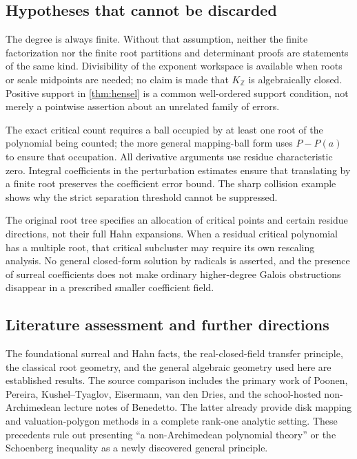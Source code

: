 \documentclass[11pt,letterpaper]{article}
\numberwithin{equation}{section}
\theoremstyle{definition}
\theoremstyle{remark}\newtheorem{remark}[theorem]{Remark}
\newcommand{\Z}{\mathbb Z}
\begin{document}
\subsection{Hypotheses that cannot be discarded}
The degree is always finite. Without that assumption, neither the
finite factorization nor the finite root partitions and determinant
proofs are statements of the same kind. Divisibility of the exponent
workspace is available when roots or scale midpoints are needed;
no claim is made that $K_\Z$ is algebraically closed. Positive support
in \cref{thm:hensel} is a common well-ordered support condition, not
merely a pointwise assertion about an unrelated family of errors.

The exact critical count requires a ball occupied by at least one
root of the polynomial being counted; the more general mapping-ball
form uses $P-P(a)$ to ensure that occupation. All derivative arguments
use residue characteristic zero. Integral coefficients in the
perturbation estimates ensure that translating by a finite root
preserves the coefficient error bound. The sharp collision example
shows why the strict separation threshold cannot be suppressed.

The original root tree specifies an allocation of critical points and
certain residue directions, not their full Hahn expansions. When a
residual critical polynomial has a multiple root, that critical
subcluster may require its own rescaling analysis. No general
closed-form solution by radicals is asserted, and the presence of
surreal coefficients does not make ordinary higher-degree Galois
obstructions disappear in a prescribed smaller coefficient field.

\subsection{Literature assessment and further directions}
The foundational surreal and Hahn facts, the real-closed-field transfer
principle, the classical root geometry, and the general algebraic
geometry used here are established results. The source comparison
includes the primary work of Poonen, Pereira, Kushel--Tyaglov,
Eisermann, van den Dries, and the school-hosted non-Archimedean lecture
notes of Benedetto. The latter already provide disk mapping and
valuation-polygon methods in a complete rank-one analytic setting.
These precedents rule out presenting ``a non-Archimedean polynomial
theory'' or the Schoenberg inequality as a newly discovered general
principle.
\end{document}

